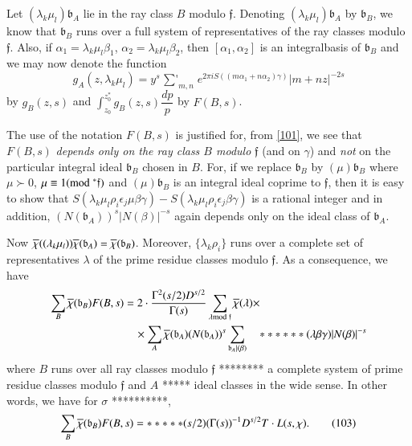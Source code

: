 Let $(\lambda_{k}\mu_{l})\mathfrak{b}_{A}$ lie in the ray class $B$
modulo $\mathfrak{f}$. Denoting $(\lambda_{k}\mu_{l})\mathfrak{b}_{A}$
by $\mathfrak{b}_{B}$, we know that $\mathfrak{b}_{B}$ runs over a
full system of representatives of the ray classes modulo
$\mathfrak{f}$. Also, if $\alpha_{1}=\lambda_{k}\mu_{l}\beta_{1}$,
$\alpha_{2}=\lambda_{k}\mu_{l}\beta_{2}$, then
$[\alpha_{1},\alpha_{2}]$ is an integral\pageoriginale basis of
$\mathfrak{b}_{B}$ and we may now denote the function
$$
g_{A}(z,\lambda_{k}\mu_{l})=y^{s}\mathop{{\sum}'}_{m,n}e^{2\pi
  iS((m\alpha_{1}+n\alpha_{2})\gamma)}|m+nz|^{-2s}
$$
by $g_{B}(z,s)$ and $\int^{z^{\ast}_{0}}_{z_{0}}
g_{B}(z,s)\dfrac{dp}{p}$ by $F(B,s)$.


The use of the notation $F(B,s)$ is justified for, from \eqref{101},
we see that $F(B,s)$ {\em depends only on the ray class $B$ modulo}
$\mathfrak{f}$ (and on $\gamma$) and {\em not} on the particular
integral ideal $\mathfrak{b}_{B}$ chosen in $B$. For, if we replace
$\mathfrak{b}_{B}$ by $(\mu)\mathfrak{b}_{B}$ where $\mu \succ 0$,
$\mu\equiv 1(\rm{mod} \;^{\ast}\mathfrak{f})$ and $(\mu)\mathfrak{b}_{B}$ is
an integral ideal coprime to $\mathfrak{f}$, then it is easy to show
that
$S(\lambda_{k}\mu_{l}\rho_{i}\epsilon_{j}\mu\beta\gamma)-S(\lambda_{k}\mu_{l}\rho_{i}\epsilon_{j}\beta\gamma)$
is a rational integer and in addition,
$(N(\mathfrak{b}_{A}))^{s}|N(\beta)|^{-s}$ again depends only on the
ideal class of $\mathfrak{b}_{A}$.

Now
$\overline{\chi}((\lambda_{k}\mu_{l}))\overline{\chi}(\mathfrak{b}_{A})=\overline{\chi}(\mathfrak{b}_{B})$. Moreover,
$\{\lambda_{k}\rho_{i}\}$ runs over a complete set of representatives
$\lambda$ of the prime residue classes modulo $\mathfrak{f}$. As a
consequence, we have
\begin{align*}
\sum_{B}\overline{\chi}(\mathfrak{b}_{B})F(B,s) &= 2\cdot
\frac{\Gamma^{2}(s/2)D^{s/2}}{\Gamma(s)}\sum_{\lambda\rm{mod} \;\mathfrak{f}}\overline{\chi}(\lambda)\times\\
&\quad \times
\sum_{A}\overline{\chi}(\mathfrak{b}_{A})(N(\mathfrak{b}_{A}))^{s}\sum_{\mathfrak{b}_{A}|(\beta)}\quad ******
    {(\lambda\beta\gamma)}|N(\beta)|^{-s} 
\end{align*}
where $B$ runs over all ray classes modulo $\mathfrak{f}$ ******** a
complete system of prime residue classes modulo $\mathfrak{f}$ and $A$
***** ideal classes in the wide sense. In other words, we have for
$\sigma$ **********,
\begin{equation*}
\sum_{B}\overline{\chi}(\mathfrak{b}_{B})F(B,s)= *****
(s/2)(\Gamma(s))^{-1}D^{s/2}T\cdot L(s,\chi).\tag{103}\label{103}
\end{equation*}

